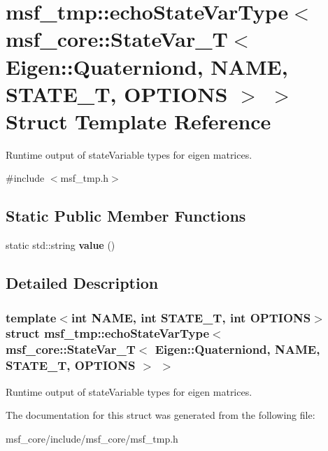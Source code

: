 \hypertarget{structmsf__tmp_1_1echoStateVarType_3_01msf__core_1_1StateVar__T_3_01Eigen_1_1Quaterniond_00_01NAd8d0cc57ae8a4161cb849186069681d6}{\section{msf\-\_\-tmp\-:\-:echo\-State\-Var\-Type$<$ msf\-\_\-core\-:\-:State\-Var\-\_\-\-T$<$ Eigen\-:\-:Quaterniond, N\-A\-M\-E, S\-T\-A\-T\-E\-\_\-\-T, O\-P\-T\-I\-O\-N\-S $>$ $>$ Struct Template Reference}
\label{structmsf__tmp_1_1echoStateVarType_3_01msf__core_1_1StateVar__T_3_01Eigen_1_1Quaterniond_00_01NAd8d0cc57ae8a4161cb849186069681d6}
}


Runtime output of state\-Variable types for eigen matrices.  




{\ttfamily \#include $<$msf\-\_\-tmp.\-h$>$}

\subsection*{Static Public Member Functions}
\begin{DoxyCompactItemize}
\item 
\hypertarget{structmsf__tmp_1_1echoStateVarType_3_01msf__core_1_1StateVar__T_3_01Eigen_1_1Quaterniond_00_01NAd8d0cc57ae8a4161cb849186069681d6_a1df57f3454008d5ff05028349e920f8e}{static std\-::string {\bfseries value} ()}\label{structmsf__tmp_1_1echoStateVarType_3_01msf__core_1_1StateVar__T_3_01Eigen_1_1Quaterniond_00_01NAd8d0cc57ae8a4161cb849186069681d6_a1df57f3454008d5ff05028349e920f8e}

\end{DoxyCompactItemize}


\subsection{Detailed Description}
\subsubsection*{template$<$int N\-A\-M\-E, int S\-T\-A\-T\-E\-\_\-\-T, int O\-P\-T\-I\-O\-N\-S$>$struct msf\-\_\-tmp\-::echo\-State\-Var\-Type$<$ msf\-\_\-core\-::\-State\-Var\-\_\-\-T$<$ Eigen\-::\-Quaterniond, N\-A\-M\-E, S\-T\-A\-T\-E\-\_\-\-T, O\-P\-T\-I\-O\-N\-S $>$ $>$}

Runtime output of state\-Variable types for eigen matrices. 

The documentation for this struct was generated from the following file\-:\begin{DoxyCompactItemize}
\item 
msf\-\_\-core/include/msf\-\_\-core/msf\-\_\-tmp.\-h\end{DoxyCompactItemize}
